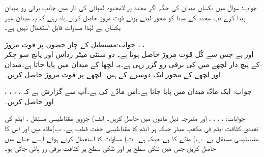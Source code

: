 جواب:
سوال  میں یکساں میدان کی جگہ اگر  محدد پر لامحدود لمبائی کی تار میں  جانب  برقی رو میدان پیدا کرے تب محدد کے مبدا  کو محور لیتے ہوئے قوت مروڑ حاصل کریں۔یاد رہے کہ یہ میدان غیر یکساں ہے لہٰذا مساوات   قابل استعمال نہیں ہے۔

جواب:مستطیل کے چار حصوں پر قوت مروڑ ، ، \\
 اور   ہے جس سے کُل قوت مروڑ   حاصل ہوتا ہے۔
دو سنٹی میٹر رداس اور پانچ سو چکر کے پیچ دار لچھے میں  کی برقی رو گزر رہی ہے۔یہ لچھا  کے میدان میں پایا جاتا ہے۔میدان اور لچھے کے محور ایک دوسرے کے   ہیں۔ لچھے پر قوت مروڑ حاصل کریں۔

جواب:
ایک مادّہ  میدان  میں پایا جاتا ہے۔اس مادّے کی  ہے۔آپ سے گزارش ہے کہ ، ، ،  ، اور  حاصل کریں۔

جوابات: ، ، ، ،  اور 
مندرجہ ذیل مادوں میں  حاصل کریں۔ الف) جزوی مقناطیسی مستقل ، ایٹم کی تعددی کثافت  ایٹم فی مکعب میٹر جبکہ ہر ایٹم کا مقناطیسی جفت قطب  ہے۔ ب)مادّہ میں  اور  اس کا مقناطیسی مستقل  ہے۔ پ) مادّے کا  ہے جبکہ  ہے۔ ت) مساوات  کا استعمال کرتے ہوئے  ایسے خطے میں  حاصل کریں جس میں نلکی سطح  پر  اور نلکی سطح  پر  کثافت برقی رو پائی جاتی ہو۔

